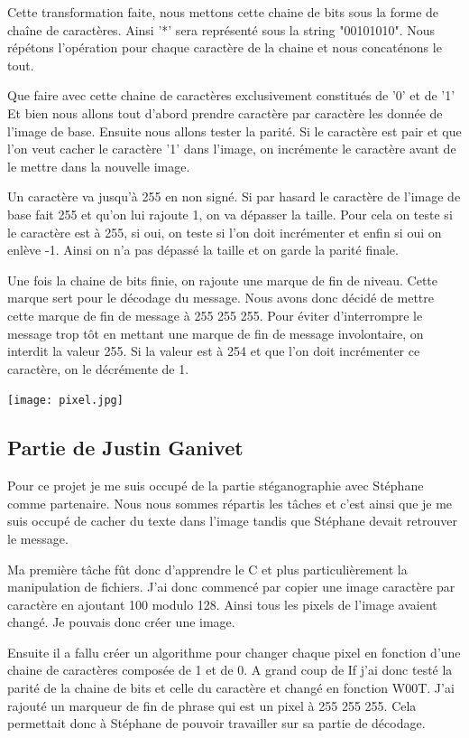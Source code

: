 \documentclass[a4paper,12pt]{article}
\begin{document}
Cette transformation faite, nous mettons cette chaine de bits sous la forme de chaîne de caractères. Ainsi '*' sera représenté sous la string "00101010". Nous répétons l'opération pour chaque caractère de la chaine et nous concaté\-nons le tout.

Que faire avec cette chaine de caractères exclusivement constitués de '0' et de '1' Et bien nous allons tout d'abord prendre caractère par caractère les donnée de l'image de base. Ensuite nous allons tester la parité. Si le caractère est pair et que l'on veut cacher le caractère '1' dans l'image, on incrémente le caractère avant de le mettre dans la nouvelle image.

Un caractère va jusqu’à 255 en non signé. Si par hasard le caractère de l'image de base fait 255 et qu'on lui rajoute 1, on va dépasser la taille. Pour cela on teste si le caractère est à 255, si oui, on teste si l'on doit incrémenter et enfin si oui on enlève -1. Ainsi on n’a pas dépassé la taille et on garde la parité finale.

Une fois la chaine de bits finie, on rajoute une marque de fin de niveau. Cette marque sert pour le décodage du message. Nous avons donc décidé de mettre cette marque de fin de message à 255 255 255. Pour éviter d'interrompre le message trop tôt en mettant une marque de fin de message involontaire, on interdit la valeur 255. Si la valeur est à 254 et que l'on doit incrémenter ce caractère, on le décrémente de 1.

\begin{center}
  \texttt{[image: pixel.jpg]}
\end{center}

\subsection{Partie de Justin Ganivet}

Pour ce projet je me suis occupé de la partie stéganographie avec Stéphane comme partenaire. Nous nous sommes répartis les tâches et c'est ainsi que je me suis occupé de cacher du texte dans l'image tandis que Stéphane devait retrouver le message.

Ma première tâche fût donc d'apprendre le C et plus particulièrement la manipulation de fichiers. J'ai donc commencé par copier une image caractère par caractère en ajoutant 100 modulo 128. Ainsi tous les pixels de l'image avaient changé. Je pouvais donc créer une image.

Ensuite il a fallu créer un algorithme pour changer chaque pixel en fonction d'une chaine de caractères composée de 1 et de 0. A grand coup de If j'ai donc testé la parité de la chaine de bits et celle du caractère et changé en fonction W00T. J'ai rajouté un marqueur de fin de phrase qui est un pixel à 255 255 255. Cela permettait donc à Stéphane de pouvoir travailler sur sa partie de décodage. 
\end{document}

